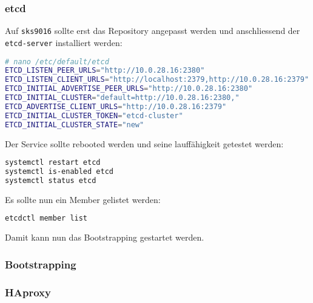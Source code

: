     \subsubsection{etcd}
    Auf \texttt{sks9016} sollte erst das Repository angepasst werden und anschliessend der \texttt{etcd-server} installiert werden:
\lstset{style=gra_codestyle}
\begin{lstlisting}[language=bash, caption=Patroni - etcd-server konfigurieren=b,label={lst:patroni-etcd-server-config},breaklines=true]
# nano /etc/default/etcd
ETCD_LISTEN_PEER_URLS="http://10.0.28.16:2380"
ETCD_LISTEN_CLIENT_URLS="http://localhost:2379,http://10.0.28.16:2379"
ETCD_INITIAL_ADVERTISE_PEER_URLS="http://10.0.28.16:2380"
ETCD_INITIAL_CLUSTER="default=http://10.0.28.16:2380,"
ETCD_ADVERTISE_CLIENT_URLS="http://10.0.28.16:2379"
ETCD_INITIAL_CLUSTER_TOKEN="etcd-cluster"
ETCD_INITIAL_CLUSTER_STATE="new"
\end{lstlisting}
    Der Service sollte rebooted werden und seine lauffähigkeit getestet werden:
\lstset{style=gra_codestyle}
\begin{lstlisting}[language=bash, caption=Patroni - etcd-server reboot=b,label={lst:patroni-etcd-server-reboot},breaklines=true]
systemctl restart etcd
systemctl is-enabled etcd
systemctl status etcd
\end{lstlisting}
    Es sollte nun ein Member gelistet werden:
\lstset{style=gra_codestyle}
\begin{lstlisting}[language=bash, caption=Patroni - etcd-server list menber=b,label={lst:patroni-etcd-server-list-member},breaklines=true]
etcdctl member list
\end{lstlisting}
    Damit kann nun das Bootstrapping gestartet werden.
    \subsubsection{Bootstrapping}
    \subsubsection{HAproxy}

